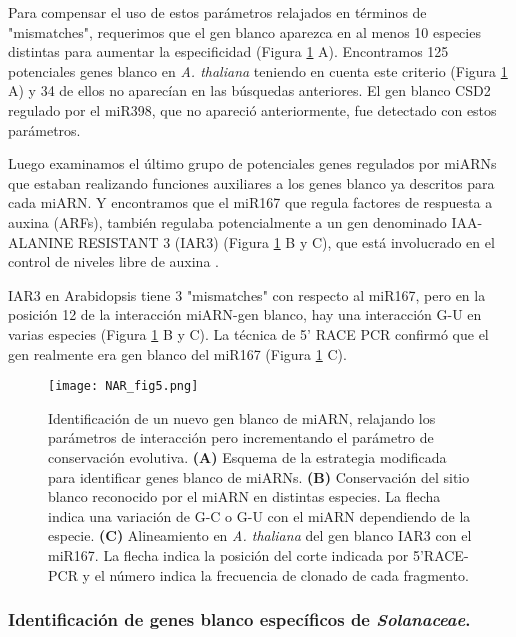 Para compensar el uso de estos parámetros relajados en términos de "mismatches", requerimos que el gen blanco aparezca en al menos 10 especies distintas para aumentar la especificidad (Figura \ref{fig:NAR_fig5} A).
Encontramos 125 potenciales genes blanco en \textit{A. thaliana} teniendo en cuenta este criterio (Figura \ref{fig:NAR_fig5} A) y 34 de ellos no aparecían en las búsquedas anteriores.
El gen blanco CSD2 regulado por el miR398, que no apareció anteriormente, fue detectado con estos parámetros. 

Luego examinamos el último grupo de potenciales genes regulados por miARNs que estaban realizando funciones auxiliares a los genes blanco ya descritos para cada miARN. 
Y encontramos que el miR167 que regula factores de respuesta a auxina (ARFs), también regulaba potencialmente a un gen denominado IAA-ALANINE RESISTANT 3 (IAR3) (Figura \ref{fig:NAR_fig5} B y C), que está involucrado en el control de niveles libre de auxina \citep{Davies1999,Rampey2004}.

IAR3 en Arabidopsis tiene 3 "mismatches" con respecto al miR167, pero en la posición 12 de la interacción miARN-gen blanco, hay una interacción G-U en varias especies (Figura \ref{fig:NAR_fig5} B y C).
La técnica de 5’ RACE PCR confirmó que el gen realmente era gen blanco del miR167 (Figura \ref{fig:NAR_fig5} C).

\begin{figure}[htbp!] 
    \centering    
    \texttt{[image: NAR\_fig5.png]}
    \caption[Identificación de un nuevo gen blanco de miARN]{Identificación de un nuevo gen blanco de miARN, relajando los parámetros de interacción pero incrementando el parámetro de conservación evolutiva.
    \textbf{(A)} Esquema de la estrategia modificada para identificar genes blanco de miARNs.
    \textbf{(B)} Conservación del sitio blanco reconocido por el miARN en distintas especies.
    La flecha indica una variación de G-C o G-U con el miARN dependiendo de la especie.
    \textbf{(C)} Alineamiento en \textit{A. thaliana} del gen blanco IAR3 con el miR167. La flecha indica la posición del corte indicada por 5’RACE-PCR y el número indica la frecuencia de clonado de cada fragmento.}
    \label{fig:NAR_fig5}
\end{figure}


\subsubsection{Identificación de genes blanco específicos de \textit{Solanaceae}.}

